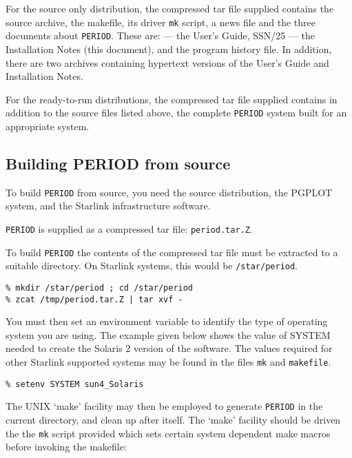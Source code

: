 For the source only distribution, the compressed tar file supplied
contains the source archive, the makefile, its driver {\tt mk} script,
a news file and the three documents about {\tt PERIOD}.  These are:
 --- the User's Guide, SSN/25 --- the
Installation Notes (this document), and the program history file.  In
addition, there are two
archives containing hypertext versions of the User's Guide and
Installation Notes.

For the ready-to-run distributions, the compressed tar file supplied
contains in addition to the source files listed above, the complete
{\tt PERIOD} system built for an appropriate system.

\subsection{Building PERIOD from source}

To build {\tt PERIOD} from source, you need the source distribution, the
PGPLOT system, and the Starlink infrastructure software.

{\tt PERIOD} is supplied as a compressed tar file: {\tt period.tar.Z}.

To build {\tt PERIOD} the contents of the compressed tar file must be
extracted to a suitable directory.  On Starlink systems, this
would be {\tt /star/period}.

\begin{myquote}
\begin{verbatim}
% mkdir /star/period ; cd /star/period
% zcat /tmp/period.tar.Z | tar xvf -
\end{verbatim}
\end{myquote}

You must then set an environment variable to identify the type of
operating system you are using.  The example given below shows the
value of SYSTEM needed to create the Solaris 2 version of the software.
The values required for other Starlink supported systems may be found
in the files {\tt mk} and {\tt makefile}.

\begin{myquote}
\begin{verbatim}
% setenv SYSTEM sun4_Solaris
\end{verbatim}
\end{myquote}

The UNIX `make' facility may then be employed to generate {\tt PERIOD}
in the current directory, and clean up after itself.  The `make' facility
should be driven the the {\tt mk} script provided which sets certain
system dependent make macros before invoking the makefile:

